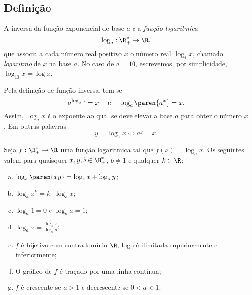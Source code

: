 \subsection{Definição}

\begin{definition}
A inversa da função exponencial de base $a$ é a \emph{função
logarítmica}
$$\log_a : \R_+^* \to \R,$$
que associa a cada número real positivo $x$ o número real $\log_a
x$, chamado \emph{logaritmo} de $x$ na base $a$. No caso de $a=10$,
escrevemos, por simplicidade, $\log_{10}x = \log x$.
\end{definition}

\begin{remark}
	Pela definição de função inversa, tem-se
$$ a^{\log_a x}=x \ \ \ \text{ e } \ \ \ \log_a \paren{a^x} = x.$$
Assim, $\log_a x $ é o expoente ao qual se deve elevar a base $a$
para obter o número $x$. Em outras palavras,
$$ y = \log_a x \iff a^y = x.$$
\end{remark}

\begin{proposition}
	Seja $f: \R_+^* \to \R$ uma função logarítmica tal que $f(x) =
\log_a x$. Os seguintes valem para quaisquer  $x, y, b \in
\R_+^*$, $b \neq 1$ e qualquer $k \in \R$:
\begin{enumerate}[(a)]
  \item $\log_a \paren{xy} = \log_a x + \log_a y$;
  \item $\log_a x^k = k\cdot \log_a x$;
  \item $\log_a 1 = 0$ e $\log_a a = 1$;
  \item $\log_a x = \frac{\log_b x}{\log_b a}$;
  \item $f$ é bijetiva com contradomínio $\R$, logo é ilimitada superiormente e inferiormente;
  \item O gráfico de $f$ é traçado por uma linha contínua;
  \item $f$ é crescente se $a>1$ e decrescente se $0<a<1$.
\end{enumerate}
\end{proposition}

